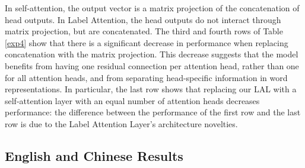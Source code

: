 \documentclass[11pt,a4paper]{article}
\begin{document}
In self-attention, the output vector is a matrix projection of the concatenation of head outputs. In Label Attention, the head outputs do not interact through matrix projection, but are concatenated. The third and fourth rows of Table \ref{exp4} show that there is a significant decrease in performance when replacing concatenation with the matrix projection. This decrease suggests that the model benefits from having one residual connection per attention head, rather than one for all attention heads, and from separating head-specific information in word representations. In particular, the last row shows that replacing our LAL with a self-attention layer with an equal number of attention heads decreases performance: the difference between the performance of the first row and the last row is due to the Label Attention Layer's architecture novelties.

\subsection{English and Chinese Results}
\end{document}
